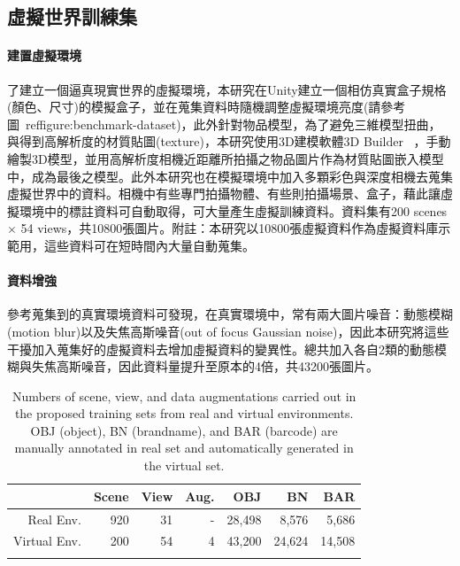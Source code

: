 \subsection{虛擬世界訓練集}
\paragraph{建置虛擬環境}
了建立一個逼真現實世界的虛擬環境，本研究在Unity建立一個相仿真實盒子規格(顏色、尺寸)的模擬盒子，並在蒐集資料時隨機調整虛擬環境亮度(請參考圖~ref{figure:benchmark-dataset})，此外針對物品模型，為了避免三維模型扭曲，與得到高解析度的材質貼圖(texture)，本研究使用3D建模軟體3D Builder ~\cite{3DBuilder}，手動繪製3D模型，並用高解析度相機近距離所拍攝之物品圖片作為材質貼圖嵌入模型中，成為最後之模型。此外本研究也在模擬環境中加入多顆彩色與深度相機去蒐集虛擬世界中的資料。相機中有些專門拍攝物體、有些則拍攝場景、盒子，藉此讓虛擬環境中的標註資料可自動取得，可大量產生虛擬訓練資料。資料集有200 scenes$\times$ 54 views，共10800張圖片。附註：本研究以10800張虛擬資料作為虛擬資料庫示範用，這些資料可在短時間內大量自動蒐集。

\paragraph{資料增強}
參考蒐集到的真實環境資料可發現，在真實環境中，常有兩大圖片噪音：動態模糊(motion blur)以及失焦高斯噪音(out of focus Gaussian noise)，因此本研究將這些干擾加入蒐集好的虛擬資料去增加虛擬資料的變異性。總共加入各自2類的動態模糊與失焦高斯噪音，因此資料量提升至原本的4倍，共43200張圖片。

\begin{table}[ht]
\caption{Numbers of scene, view, and data augmentations carried out in the proposed training sets from real and virtual environments. OBJ (object), BN (brandname), and BAR (barcode) are manually annotated in real set and automatically generated in the virtual set.}
\centering
\begin{tabular}{rrrr|rrr}
\hline
         & Scene & View & Aug. & OBJ       & BN       & BAR \\ \hline
Real Env. 	& 920   & 31   & -        & 28,498       & 8,576    & 5,686     \\
Virtual Env.   	& 200   & 54   & 4      & 43,200       & 24,624         & 14,508          \\
\hline
\label{table:training_set_table}
\end{tabular}
\end{table}

